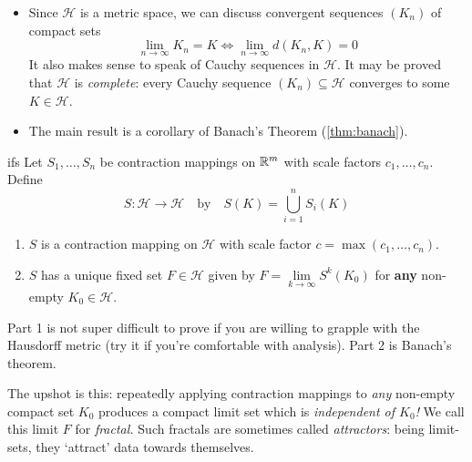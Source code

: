\begin{itemize}
  \item Since $\mathcal H$ is a metric space, we can discuss convergent sequences $(K_n)$ of compact sets
	\[
		\lim_{n\to\infty}K_n=K\iff \lim_{n\to\infty}d(K_n,K)=0
	\]
	It also makes sense to speak of Cauchy sequences in $\mathcal H$. It may be proved that $\mathcal H$ is \emph{complete}: every Cauchy sequence $(K_n)\subseteq\mathcal H$ converges to some $K\in\mathcal H$.
	
  \item The main result is a corollary of Banach's Theorem (\ref{thm:banach}).
\end{itemize}


\begin{thm}{}{ifs}
	Let $S_1,\ldots,S_n$ be contraction mappings on $\mathbb{R}^m$ with scale factors $c_1,\ldots,c_n$. Define
	\[
		S:\mathcal H\to\mathcal H
		\quad\text{by}\quad 
		S(K)=\bigcup_{i=1}^nS_i(K)
	\]
	\vspace{-\parsep}
	\begin{enumerate}
	  \item $S$ is a contraction mapping on $\mathcal H$ with scale factor $c=\max(c_1,\ldots,c_n)$.
	  \item $S$ has a unique fixed set $F\in\mathcal H$ given by $F=\lim\limits_{k\to\infty} S^k(K_0)$ for \textbf{any} non-empty $K_0\in\mathcal H$.
	\end{enumerate}
\end{thm}

Part 1 is not super difficult to prove if you are willing to grapple with the Hausdorff metric (try it if you're comfortable with analysis). Part 2 is Banach's theorem.\smallbreak

The upshot is this: repeatedly applying contraction mappings to \emph{any} non-empty compact set $K_0$ produces a compact limit set which is \emph{independent of $K_0$!} We call this limit $F$ for \emph{fractal.} Such fractals are sometimes called \emph{attractors}: being limit-sets, they `attract' data towards themselves.


